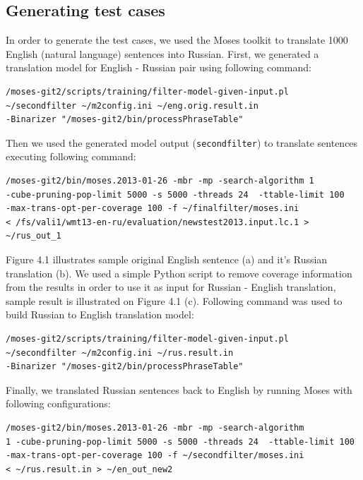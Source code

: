\subsection{Generating test cases}

In order to generate the test cases, we used the Moses toolkit to translate 1000 English (natural language) sentences into Russian. First, we generated a translation model for English - Russian pair using following command:

\begin{verbatim}
/moses-git2/scripts/training/filter-model-given-input.pl 
~/secondfilter ~/m2config.ini ~/eng.orig.result.in 
-Binarizer "/moses-git2/bin/processPhraseTable"
\end{verbatim} 

Then we used the generated model output (\texttt{secondfilter}) to translate sentences executing following command:

\begin{verbatim}
/moses-git2/bin/moses.2013-01-26 -mbr -mp -search-algorithm 1 
-cube-pruning-pop-limit 5000 -s 5000 -threads 24  -ttable-limit 100
-max-trans-opt-per-coverage 100 -f ~/finalfilter/moses.ini 
< /fs/vali1/wmt13-en-ru/evaluation/newstest2013.input.lc.1 > ~/rus_out_1
\end{verbatim} 

Figure 4.1 illustrates sample original English sentence (a) and it's Russian translation (b). We used a simple Python script to remove coverage information from the results in order to use it as input for Russian - English translation, sample result is illustrated on Figure 4.1 (c). Following command was used to build Russian to English translation model:

\begin{verbatim}
/moses-git2/scripts/training/filter-model-given-input.pl 
~/secondfilter ~/m2config.ini ~/rus.result.in 
-Binarizer "/moses-git2/bin/processPhraseTable"
\end{verbatim} 

Finally, we translated Russian sentences back to English by running Moses with following configurations:

\begin{verbatim}
/moses-git2/bin/moses.2013-01-26 -mbr -mp -search-algorithm 
1 -cube-pruning-pop-limit 5000 -s 5000 -threads 24  -ttable-limit 100
-max-trans-opt-per-coverage 100 -f ~/secondfilter/moses.ini 
< ~/rus.result.in > ~/en_out_new2
\end{verbatim} 

